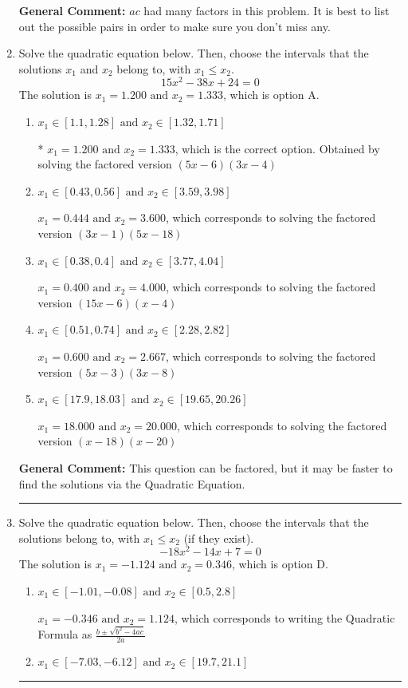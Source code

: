 \documentclass{extbook}[14pt]
\newcommand{\litem}[1]{\item #1

\rule{\textwidth}{0.4pt}}
\begin{document}
\begin{enumerate}
{\textbf{General Comment:} $ac$ had many factors in this problem. It is best to list out the possible pairs in order to make sure you don't miss any.
}
\litem{
Solve the quadratic equation below. Then, choose the intervals that the solutions $x_1$ and $x_2$ belong to, with $x_1 \leq x_2$.
\[ 15x^{2} -38 x + 24 = 0 \]
The solution is \( x_1 = 1.200 \text{ and } x_2 = 1.333 \), which is option A.\begin{enumerate}[label=\Alph*.]
\item \( x_1 \in [1.1, 1.28] \text{ and } x_2 \in [1.32, 1.71] \)

* $x_1 = 1.200 \text{ and } x_2 = 1.333$, which is the correct option. Obtained by solving the factored version $(5x -6)(3x -4)$
\item \( x_1 \in [0.43, 0.56] \text{ and } x_2 \in [3.59, 3.98] \)

$x_1 = 0.444 \text{ and } x_2 = 3.600$, which corresponds to solving the factored version $(3x -1)(5x -18)$
\item \( x_1 \in [0.38, 0.4] \text{ and } x_2 \in [3.77, 4.04] \)

$x_1 = 0.400 \text{ and } x_2 = 4.000$, which corresponds to solving the factored version $(15x -6)(x -4)$
\item \( x_1 \in [0.51, 0.74] \text{ and } x_2 \in [2.28, 2.82] \)

$x_1 = 0.600 \text{ and } x_2 = 2.667$, which corresponds to solving the factored version $(5x -3)(3x -8)$
\item \( x_1 \in [17.9, 18.03] \text{ and } x_2 \in [19.65, 20.26] \)

$x_1 = 18.000 \text{ and } x_2 = 20.000$, which corresponds to solving the factored version $(x -18)(x -20)$
\end{enumerate}

\textbf{General Comment:} This question can be factored, but it may be faster to find the solutions via the Quadratic Equation.
}
\litem{
Solve the quadratic equation below. Then, choose the intervals that the solutions belong to, with $x_1 \leq x_2$ (if they exist).
\[ -18x^{2} -14 x + 7 = 0 \]
The solution is \( x_1 = -1.124 \text{ and } x_2 = 0.346 \), which is option D.\begin{enumerate}[label=\Alph*.]
\item \( x_1 \in [-1.01, -0.08] \text{ and } x_2 \in [0.5, 2.8] \)

 $x_1 = -0.346 \text{ and } x_2 = 1.124$, which corresponds to writing the Quadratic Formula as $\frac{b \pm \sqrt{b^2 - 4ac}}{2a}$
\item \( x_1 \in [-7.03, -6.12] \text{ and } x_2 \in [19.7, 21.1] \)


\end{enumerate}}
\end{enumerate}
\end{document}
